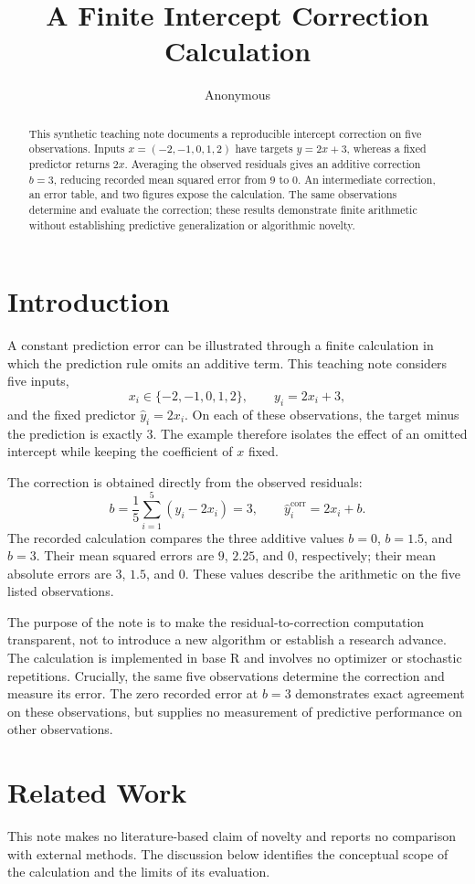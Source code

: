 \documentclass[11pt]{article}
\title{A Finite Intercept Correction Calculation}
\author{Anonymous}
\date{}
\begin{document}
\maketitle
\begin{abstract}
This synthetic teaching note documents a reproducible intercept correction on five observations. Inputs $x=(-2,-1,0,1,2)$ have targets $y=2x+3$, whereas a fixed predictor returns $2x$. Averaging the observed residuals gives an additive correction $b=3$, reducing recorded mean squared error from $9$ to $0$. An intermediate correction, an error table, and two figures expose the calculation. The same observations determine and evaluate the correction; these results demonstrate finite arithmetic without establishing predictive generalization or algorithmic novelty.
\end{abstract}
\section{Introduction}
A constant prediction error can be illustrated through a finite calculation in which the prediction rule omits an additive term. This teaching note considers five inputs,
\[
x_i \in \{-2,-1,0,1,2\},
\qquad y_i=2x_i+3,
\]
and the fixed predictor $\hat{y}_i=2x_i$. On each of these observations, the target minus the prediction is exactly $3$. The example therefore isolates the effect of an omitted intercept while keeping the coefficient of $x$ fixed.

The correction is obtained directly from the observed residuals:
\[
b=\frac{1}{5}\sum_{i=1}^{5}(y_i-2x_i)=3,
\qquad
\hat{y}_i^{\mathrm{corr}}=2x_i+b.
\]
The recorded calculation compares the three additive values $b=0$, $b=1.5$, and $b=3$. Their mean squared errors are $9$, $2.25$, and $0$, respectively; their mean absolute errors are $3$, $1.5$, and $0$. These values describe the arithmetic on the five listed observations.

The purpose of the note is to make the residual-to-correction computation transparent, not to introduce a new algorithm or establish a research advance. The calculation is implemented in base R and involves no optimizer or stochastic repetitions. Crucially, the same five observations determine the correction and measure its error. The zero recorded error at $b=3$ demonstrates exact agreement on these observations, but supplies no measurement of predictive performance on other observations.

\section{Related Work}
This note makes no literature-based claim of novelty and reports no comparison with external methods. The discussion below identifies the conceptual scope of the calculation and the limits of its evaluation.
\end{document}
